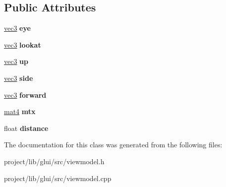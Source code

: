 \subsection*{Public Attributes}
\begin{DoxyCompactItemize}
\item 
\hypertarget{classViewModel_a5f8727833374f2d99e4c0f379f5a759e}{\hyperlink{classvec3}{vec3} {\bfseries eye}}\label{classViewModel_a5f8727833374f2d99e4c0f379f5a759e}

\item 
\hypertarget{classViewModel_a45dd187579bb94f2106a13318c1ae279}{\hyperlink{classvec3}{vec3} {\bfseries lookat}}\label{classViewModel_a45dd187579bb94f2106a13318c1ae279}

\item 
\hypertarget{classViewModel_a19c93bd7be24d0cf2359a9b96842a470}{\hyperlink{classvec3}{vec3} {\bfseries up}}\label{classViewModel_a19c93bd7be24d0cf2359a9b96842a470}

\item 
\hypertarget{classViewModel_a37d20e786feb94b5dee7e49d2c88b07c}{\hyperlink{classvec3}{vec3} {\bfseries side}}\label{classViewModel_a37d20e786feb94b5dee7e49d2c88b07c}

\item 
\hypertarget{classViewModel_a6fcbd635a72b202a1b01188b242c388e}{\hyperlink{classvec3}{vec3} {\bfseries forward}}\label{classViewModel_a6fcbd635a72b202a1b01188b242c388e}

\item 
\hypertarget{classViewModel_a3e6f4972330079fc345e917066f5cee1}{\hyperlink{classmat4}{mat4} {\bfseries mtx}}\label{classViewModel_a3e6f4972330079fc345e917066f5cee1}

\item 
\hypertarget{classViewModel_a3805a6be41e176b4bb9039c51c3a0ee6}{float {\bfseries distance}}\label{classViewModel_a3805a6be41e176b4bb9039c51c3a0ee6}

\end{DoxyCompactItemize}


The documentation for this class was generated from the following files\-:\begin{DoxyCompactItemize}
\item 
project/lib/glui/src/viewmodel.\-h\item 
project/lib/glui/src/viewmodel.\-cpp\end{DoxyCompactItemize}
